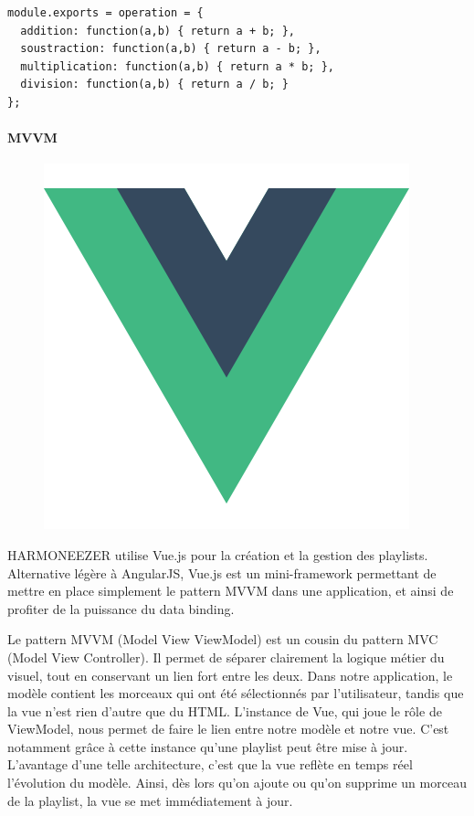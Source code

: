 \documentclass[a4paper,12pt]{article}
\begin{document}
\begin{lstlisting}
module.exports = operation = {
  addition: function(a,b) { return a + b; },
  soustraction: function(a,b) { return a - b; },
  multiplication: function(a,b) { return a * b; },
  division: function(a,b) { return a / b; }
};
\end{lstlisting}

\paragraph{MVVM}

\begin{figure}[!h]
  \begin{center}
    \includegraphics[scale=0.2]{logo-vuejs.png}
  \end{center}
\end{figure}

HARMONEEZER utilise Vue.js pour la création et la gestion des playlists. Alternative légère à AngularJS, Vue.js est un mini-framework permettant de mettre en place simplement le pattern MVVM dans une application, et ainsi de profiter de la puissance du data binding.

Le pattern MVVM (Model View ViewModel) est un cousin du pattern MVC (Model View Controller). Il permet de séparer clairement la logique métier du visuel, tout en conservant un lien fort entre les deux. Dans notre application, le modèle contient les morceaux qui ont été sélectionnés par l'utilisateur, tandis que la vue n'est rien d'autre que du HTML. L'instance de Vue, qui joue le rôle de ViewModel, nous permet de faire le lien entre notre modèle et notre vue. C'est notamment grâce à cette instance qu'une playlist peut être mise à jour. L'avantage d'une telle architecture, c'est que la vue reflète en temps réel l'évolution du modèle. Ainsi, dès lors qu'on ajoute ou qu'on supprime un morceau de la playlist, la vue se met immédiatement à jour.
\end{document}

